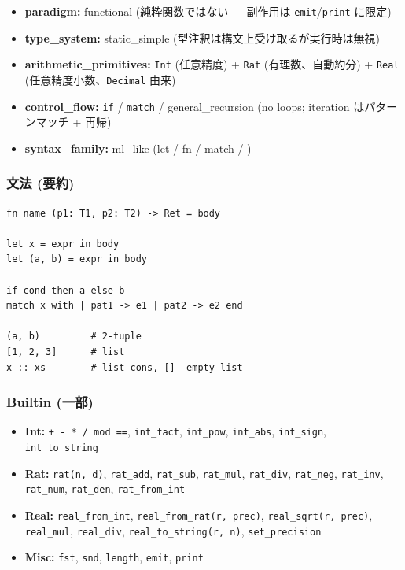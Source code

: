 \documentclass[
]{ltjsarticle}
\providecommand{\tightlist}{%
  \setlength{\itemsep}{0pt}\setlength{\parskip}{0pt}}
\begin{document}
\begin{itemize}
\tightlist
\item
  \textbf{paradigm:} functional (純粋関数ではない --- 副作用は
  \texttt{emit}/\texttt{print} に限定)
\item
  \textbf{type\_system:} static\_simple
  (型注釈は構文上受け取るが実行時は無視)
\item
  \textbf{arithmetic\_primitives:} \texttt{Int} (任意精度) +
  \texttt{Rat} (有理数、自動約分) + \texttt{Real}
  (任意精度小数、\texttt{Decimal} 由来)
\item
  \textbf{control\_flow:} \texttt{if} / \texttt{match} /
  general\_recursion (no loops; iteration はパターンマッチ + 再帰)
\item
  \textbf{syntax\_family:} ml\_like (let / fn / match / \textbar)
\end{itemize}

\subsubsection{文法 (要約)}\label{ux6587ux6cd5-ux8981ux7d04}

\begin{verbatim}
fn name (p1: T1, p2: T2) -> Ret = body

let x = expr in body
let (a, b) = expr in body

if cond then a else b
match x with | pat1 -> e1 | pat2 -> e2 end

(a, b)         # 2-tuple
[1, 2, 3]      # list
x :: xs        # list cons, []  empty list
\end{verbatim}

\subsubsection{Builtin (一部)}\label{builtin-ux4e00ux90e8}

\begin{itemize}
\tightlist
\item
  \textbf{Int:} \texttt{+\ -\ *\ /\ mod\ ==}, \texttt{int\_fact},
  \texttt{int\_pow}, \texttt{int\_abs}, \texttt{int\_sign},
  \texttt{int\_to\_string}
\item
  \textbf{Rat:} \texttt{rat(n,\ d)}, \texttt{rat\_add},
  \texttt{rat\_sub}, \texttt{rat\_mul}, \texttt{rat\_div},
  \texttt{rat\_neg}, \texttt{rat\_inv}, \texttt{rat\_num},
  \texttt{rat\_den}, \texttt{rat\_from\_int}
\item
  \textbf{Real:} \texttt{real\_from\_int},
  \texttt{real\_from\_rat(r,\ prec)}, \texttt{real\_sqrt(r,\ prec)},
  \texttt{real\_mul}, \texttt{real\_div},
  \texttt{real\_to\_string(r,\ n)}, \texttt{set\_precision}
\item
  \textbf{Misc:} \texttt{fst}, \texttt{snd}, \texttt{length},
  \texttt{emit}, \texttt{print}
\end{itemize}
\end{document}
